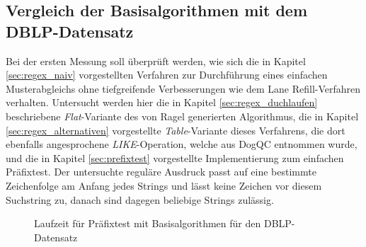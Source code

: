 \subsection{Vergleich der Basisalgorithmen mit dem DBLP-Datensatz}
\label{sec:regex_evaluation_beobachtung_1}

Bei der ersten Messung soll überprüft werden, wie sich die in Kapitel \ref{sec:regex_naiv} vorgestellten Verfahren zur Durchführung eines einfachen Musterabgleichs ohne tiefgreifende Verbesserungen wie dem Lane Refill-Verfahren verhalten.
Untersucht werden hier die in Kapitel \ref{sec:regex_duchlaufen} beschriebene \emph{Flat}-Variante des von Ragel generierten Algorithmus, die in Kapitel \ref{sec:regex_alternativen} vorgestellte \emph{Table}-Variante dieses Verfahrens, die dort ebenfalls angesprochene \emph{LIKE}-Operation, welche aus DogQC entnommen wurde, und die in Kapitel \ref{sec:prefixtest} vorgestellte Implementierung zum einfachen Präfixtest.
Der untersuchte reguläre Ausdruck passt auf eine bestimmte Zeichenfolge am Anfang jedes Strings und lässt keine Zeichen vor diesem Suchstring zu, danach sind dagegen beliebige Strings zulässig. 

\begin{figure}[]
	\centering
	\caption{Laufzeit für Präfixtest mit Basisalgorithmen für den DBLP-Datensatz}
	\label{fig:regex_dblpANY_no_buffer}
\end{figure}

